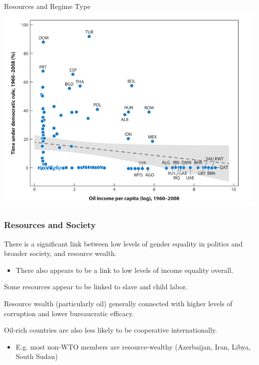 \documentclass[handout]{beamer}
\begin{document}
\begin{frame}{\LARGE Resources and Regime Type}
	\centering
	\includegraphics[width=\textwidth,height=0.8\textheight,keepaspectratio]{regime type.png}
\end{frame}

\begin{frame} 
	\frametitle{\LARGE{Resources and Society}}
	\begin{itemize}
		\large{
			\item There is a significant link between low levels of gender equality in politics and broader society, and resource wealth. \pause
			\begin{itemize}
				\item There also appears to be a link to low levels of income equality overall. \pause
			\end{itemize}
			\item Some resources appear to be linked to slave and child labor. \pause
			\item Resource wealth (particularly oil) generally connected with higher levels of corruption and lower bureaucratic efficacy. \pause
			\item Oil-rich countries are also less likely to be cooperative internationally. \pause
			\begin{itemize}
				\item E.g. most non-WTO members are resource-wealthy (Azerbaijan, Iran, Libya, South Sudan)
			\end{itemize}
		}
	\end{itemize}
\end{frame}
\end{document}
